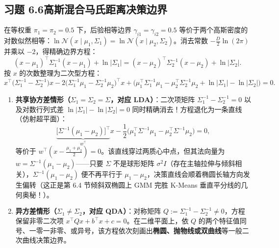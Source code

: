 \subsection*{习题 6.6\quad 高斯混合马氏距离决策边界}
在等权重 $\pi_1 = \pi_2 = 0.5$ 下，后验相等边界 $\gamma_{i1} = \gamma_{i2} = 0.5$ 等价于两个高斯密度的对数似然相等：$\ln \mathcal{N}(x \mid \mu_1, \Sigma_1) = \ln \mathcal{N}(x \mid \mu_2, \Sigma_2)$。消去常数 $-\frac{D}{2}\ln(2\pi)$ 并乘以 $-2$，得精确边界方程：
\[
  (x - \mu_1)^\top \Sigma_1^{-1} (x - \mu_1) + \ln|\Sigma_1|
  = (x - \mu_2)^\top \Sigma_2^{-1} (x - \mu_2) + \ln|\Sigma_2|.
\]
按 $x$ 的次数整理为二次型方程：
\[
  x^\top \big(\Sigma_1^{-1} - \Sigma_2^{-1}\big) x
  - 2\big(\Sigma_1^{-1}\mu_1 - \Sigma_2^{-1}\mu_2\big)^\top x
  + \big(\mu_1^\top\Sigma_1^{-1}\mu_1 - \mu_2^\top\Sigma_2^{-1}\mu_2 + \ln|\Sigma_1| - \ln|\Sigma_2|\big) = 0.
\]
\begin{enumerate}[label=(\arabic*), leftmargin=1.8em]
  \item \textbf{共享协方差情形（$\Sigma_1 = \Sigma_2 = \Sigma$，对应 LDA）}：二次项矩阵 $\Sigma_1^{-1} - \Sigma_2^{-1} = 0$ 以及对数行列式差 $\ln|\Sigma_1| - \ln|\Sigma_2| = 0$ 同时精确消去！方程退化为一条直线（仿射超平面）：
  \[
    \underbrace{\big[\Sigma^{-1}(\mu_1 - \mu_2)\big]^\top}_{w^\top} x
    - \frac{1}{2}\big(\mu_1^\top \Sigma^{-1}\mu_1 - \mu_2^\top\Sigma^{-1}\mu_2\big) = 0,
  \]
  等价于 $w^\top\!\left(x - \frac{\mu_1 + \mu_2}{2}\right) = 0$。该直线穿过两质心中点，但其法向量为 $w = \Sigma^{-1}(\mu_1 - \mu_2)$——只要 $\Sigma$ 不是球形矩阵 $\sigma^2 I$（存在主轴拉伸与倾斜相关），$\Sigma^{-1}(\mu_1 - \mu_2)$ 便不再平行于 $\mu_1 - \mu_2$，决策直线会顺着椭圆长轴方向发生偏转（这正是第 6.4 节倾斜双椭圆上 GMM 完胜 K-Means 垂直平分线的几何奥秘！）。

  \item \textbf{异方差情形（$\Sigma_1 \neq \Sigma_2$，对应 QDA）}：对称矩阵 $Q := \Sigma_1^{-1} - \Sigma_2^{-1} \neq 0$，方程保留非零二次项 $x^\top Q x + b^\top x + c = 0$。在二维平面上，依 $Q$ 的两个特征值同号、一零一非零、或异号，该方程依次刻画出\textbf{椭圆、抛物线或双曲线}等一般二次曲线决策边界。
\end{enumerate}

